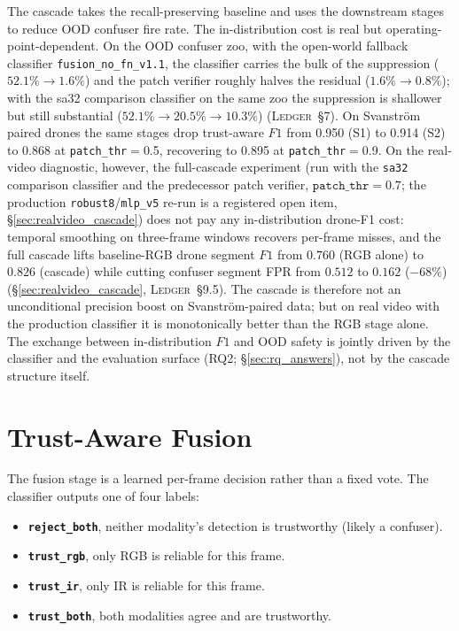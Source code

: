 \documentclass[12pt,a4paper,oneside,openright]{book}
\begin{document}
The cascade takes the recall-preserving baseline and uses the downstream stages to reduce OOD confuser fire rate. The in-distribution cost is real but operating-point-dependent. On the OOD confuser zoo, with the open-world fallback classifier \texttt{fusion\_no\_fn\_v1.1}, the classifier carries the bulk of the suppression ($52.1\% \to 1.6\%$) and the patch verifier roughly halves the residual ($1.6\% \to 0.8\%$); with the sa32 comparison classifier on the same zoo the suppression is shallower but still substantial ($52.1\% \to 20.5\% \to 10.3\%$) (\textsc{Ledger}~\S7). On Svanstr\"om paired drones the same stages drop trust-aware $F1$ from 0.950 (S1) to 0.914 (S2) to 0.868 at \texttt{patch\_thr}$=$0.5, recovering to 0.895 at \texttt{patch\_thr}$=$0.9. On the real-video diagnostic, however, the full-cascade experiment (run with the \texttt{sa32} comparison classifier and the predecessor patch verifier, $\mathtt{patch\_thr}=0.7$; the production \texttt{robust8}/\texttt{mlp\_v5} re-run is a registered open item, \S\ref{sec:realvideo_cascade}) does not pay any in-distribution drone-F1 cost: temporal smoothing on three-frame windows recovers per-frame misses, and the full cascade lifts baseline-RGB drone segment $F1$ from $0.760$ (RGB alone) to $0.826$ (cascade) while cutting confuser segment FPR from $0.512$ to $0.162$ ($-68\%$) (\S\ref{sec:realvideo_cascade}, \textsc{Ledger}~\S9.5). The cascade is therefore not an unconditional precision boost on Svanstr\"om-paired data; but on real video with the production classifier it is monotonically better than the RGB stage alone. The exchange between in-distribution $F1$ and OOD safety is jointly driven by the classifier and the evaluation surface (RQ2; \S\ref{sec:rq_answers}), not by the cascade structure itself.

\section{Trust-Aware Fusion}
\label{sec:trust_fusion}

The fusion stage is a learned per-frame decision rather than a fixed vote. The classifier outputs one of four labels:

\begin{itemize}
    \item \textbf{\texttt{reject\_both}}, neither modality's detection is trustworthy (likely a confuser).
    \item \textbf{\texttt{trust\_rgb}}, only RGB is reliable for this frame.
    \item \textbf{\texttt{trust\_ir}}, only IR is reliable for this frame.
    \item \textbf{\texttt{trust\_both}}, both modalities agree and are trustworthy.
\end{itemize}
\end{document}
